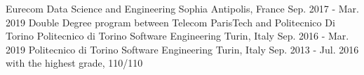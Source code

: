 \begin{cventries}
	\cventry
		{Eurecom}
		{ Data Science and Engineering}
		{Sophia Antipolis, France}
		{Sep. 2017 - Mar. 2019}
		{Double Degree program between Telecom ParisTech and Politecnico Di Torino}
	\cventry
		{Politecnico di Torino}
		{ Software Engineering}
		{Turin, Italy}
		{Sep. 2016 - Mar. 2019}
		{}
	\cventry
		{Politecnico di Torino}
		{ Software Engineering}
		{Turin, Italy}
		{Sep. 2013 - Jul. 2016}
		{with the highest grade, 110/110}
\end{cventries}
